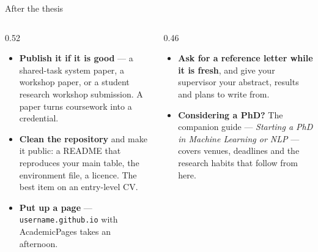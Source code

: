 \documentclass[aspectratio=169,11pt]{beamer}
\newcommand{\code}[1]{\texttt{\small #1}}
\newcommand{\key}[1]{\textbf{\color{brand}#1}}
\begin{document}
\begin{frame}{After the thesis}
\begin{columns}[T]
\begin{column}{0.52\textwidth}
\footnotesize
\begin{itemize}
  \item \key{Publish it if it is good} --- a shared-task system paper, a
        workshop paper, or a student research workshop submission. A paper
        turns coursework into a credential.
  \item \key{Clean the repository} and make it public: a README that
        reproduces your main table, the environment file, a licence. The best
        item on an entry-level CV.
  \item \key{Put up a page} --- \code{username.github.io} with AcademicPages
        takes an afternoon.
\end{itemize}
\end{column}
\begin{column}{0.46\textwidth}
\footnotesize
\begin{itemize}
  \item \key{Ask for a reference letter while it is fresh}, and give your
        supervisor your abstract, results and plans to write from.
  \item \key{Considering a PhD?} The companion guide --- \emph{Starting a PhD
        in Machine Learning or NLP} --- covers venues, deadlines and the
        research habits that follow from here.
\end{itemize}
\end{column}
\end{columns}
\end{frame}
\end{document}
